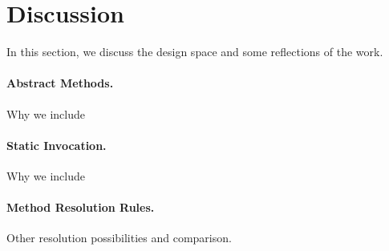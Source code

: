 \section{Discussion}
In this section, we discuss the design space and some reflections of the work. 
\paragraph{Abstract Methods.}
Why we include 
\paragraph{Static Invocation.}
Why we include
\paragraph{Method Resolution Rules.}
Other resolution possibilities and comparison.